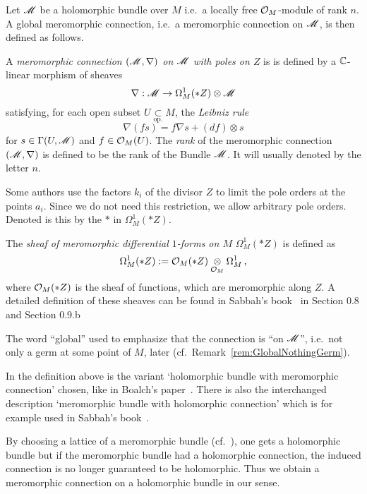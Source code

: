 Let $\mathscr{M}$ be a holomorphic bundle over $M$ i.e.\ a locally free $\mathcal{O}_M$-module
of rank $n$.
A global meromorphic connection, i.e.\ a meromorphic connection on $\mathscr{M}$, is
then defined as follows.
\begin{defn}\label{defn:mercon}
  A \emph{meromorphic connection $(\mathscr{M},\nabla)$ on $\mathscr{M}$ with poles on $Z$} is
  is defined by a $\mathbb{C}$-linear morphism of sheaves
  \[
    \nabla:\mathscr{M}\to\Omega_M^1(*Z)\otimes\mathscr{M}
  \]
  satisfying, for each open subset $U\underset{\text{op.}}{\subset} M$, the
  \emph{Leibniz rule}
    \[
      \nabla(fs)=f\nabla s+(df)\otimes s
    \]
  for $s\in\Gamma(U,\mathscr{M})$ and $f\in\mathcal{O}_M(U)$.
  The \emph{rank} of the meromorphic connection $(\mathscr{M},\nabla)$ is defined to be
  the rank of the Bundle $\mathscr{M}$.
  It will usually denoted by the letter $n$.
  \begin{s-rem}
    Some authors use the factors $k_i$ of the divisor $Z$ to limit the pole
    orders at the points $a_i$. Since we do not need this restriction, we allow
    arbitrary pole orders. Denoted is this by the $*$ in $\Omega_M^1(*Z)$.

    The \emph{sheaf of meromorphic differential $1$-forms on $M$}
    $\Omega_M^1(*Z)$ is defined as
    \[
      \Omega_M^1(*Z):=\mathcal{O}_M(*Z)\underset{\mathcal{O}_M}\otimes\Omega_M^1 \,,
    \]
    where $\mathcal{O}_M(*Z)$ is the sheaf of functions, which are meromorphic along
    $Z$.
    A detailed definition of these sheaves can be found in Sabbah's
    book~\cite{sabbah2007isomonodromic} in
    Section 0.8 and Section 0.9.b
  \end{s-rem}
\end{defn}
The word ``global'' used to emphasize that the connection is ``on $\mathscr{M}$'', i.e.\
not only a germ at some point of $M$,  later
(cf.\ Remark~\ref{rem:GlobalNothingGerm}).

In the definition above is the variant `holomorphic bundle with meromorphic
connection' chosen, like in Boalch's paper~\cite{boalch}.
There is also the interchanged description `meromorphic bundle with holomorphic
connection' which is for example used in Sabbah's
book~\cite{sabbah2007isomonodromic}.

By choosing a lattice of a meromorphic bundle
(cf.\ \cite[Def.0.8.3]{sabbah2007isomonodromic}), one gets a holomorphic bundle
but if the meromorphic bundle had a holomorphic connection, the induced
connection \rewrite{on the lattice} is no longer guaranteed to be holomorphic.
Thus we obtain a meromorphic connection on a holomorphic bundle in our sense.

